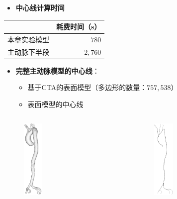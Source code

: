 \begin{frame}
\begin{itemize}
  \item \textbf{中心线计算时间}
\end{itemize}
\begin{table}[!ht]
\renewcommand{\arraystretch}{0.5}
\centering
\begin{tabular*}{50mm}{lr}
\toprule
~                                & \small{耗费时间（s）} \\
\midrule
\small{本章实验模型}             & \small{$780$}  \\
\midrule
\small{主动脉下半段}             & \small{$2,760$}  \\
\bottomrule
\end{tabular*}
\end{table}
\end{frame} 

\begin{frame}
\begin{itemize}
  \item \textbf{完整主动脉模型的中心线}：
  \begin{itemize}
     \item 基于CTA的表面模型（多边形的数量：$757,538$）
     \item 表面模型的中心线
  \end{itemize}
\end{itemize}
\begin{columns}[b,onlytextwidth]
\begin{column}{.5\textwidth}
 \begin{figure}[t]
\centering
\includegraphics[height=1.5in]{../../Figures/postprocessing/centerlines/surface.eps}
\end{figure}
\end{column}
\begin{column}{.5\textwidth}
 \begin{figure}[t]
\centering
\includegraphics[height=1.5in]{../../Figures/postprocessing/centerlines/centerlines.eps}
\end{figure}
\end{column}
\end{columns}
\end{frame}